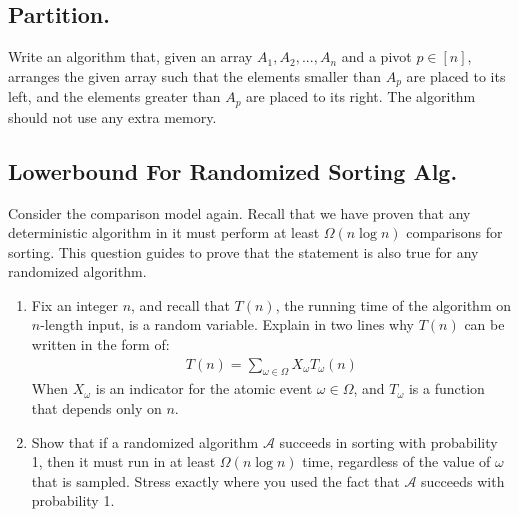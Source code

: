 \subsection{Partition.}  Write an algorithm that, given an array $A_{1},A_{2},...,A_{n}$ and a pivot $p \in [n]$, arranges the given array such that the elements smaller than $A_{p}$ are placed to its left, and the elements greater than $A_{p}$ are placed to its right. The algorithm should not use any extra memory. 



\subsection{ Lowerbound For Randomized Sorting Alg. \\  }   
Consider the comparison model again. Recall that we have proven that any deterministic algorithm in it must perform at least $\Omega(n\log n)$ comparisons for sorting. This question guides to prove that the statement is also true for any randomized algorithm.

\begin{enumerate}
  \item Fix an integer $n$, and recall that $T(n)$, the running time of the algorithm on $n$-length input, is a random variable. Explain in two lines why $T(n)$ can be written in the form of:
    \begin{equation*}
      \begin{split}
        T(n) = \sum_{\omega \in \Omega}{ X_{\omega} T_{\omega}(n) }
      \end{split}
    \end{equation*} 
 When $X_{\omega}$ is an indicator for the atomic event $\omega\in \Omega$, and $T_{\omega}$ is a function that depends only on $n$.
  \item Show that if a randomized algorithm $\mathcal{A}$ succeeds in sorting with probability 1, then it must run in at least $\Omega(n\log n)$ time, regardless of the value of $\omega$ that is sampled. Stress exactly where you used the fact that $\mathcal{A}$ succeeds with probability 1.

\end{enumerate}

